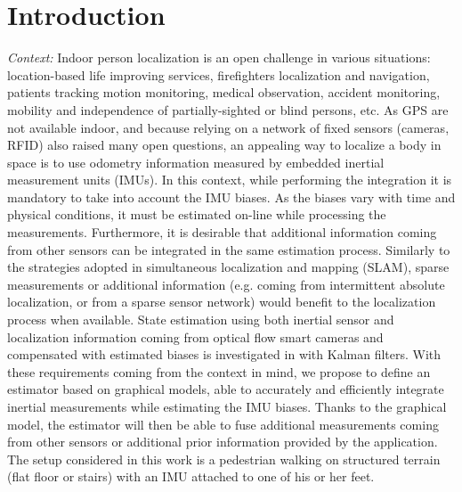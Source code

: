 
\section{Introduction}\label{sec:intro}

\textit{Context: }
Indoor person localization is an open challenge in various situations: location-based life improving services,
firefighters localization and navigation, patients tracking 
motion monitoring, medical observation, accident monitoring, mobility and independence of partially-sighted or blind persons, etc.
As GPS are not available indoor, and because relying on a network of fixed sensors (cameras, RFID) also raised many open questions, an appealing way to localize a body in space is to use odometry information measured by embedded inertial measurement units (IMUs).
In this context, while performing the integration it is mandatory to take into account the IMU biases.
As the biases vary with time and physical conditions, it must be estimated on-line while processing the measurements.
Furthermore, it is desirable that additional information coming from other sensors can be integrated in the same estimation process.
Similarly to the strategies adopted in simultaneous localization and mapping (SLAM), sparse measurements or additional information (e.g. coming from intermittent absolute localization, or from a sparse sensor network) would benefit to the localization process when available.
State estimation using both inertial sensor and localization information coming from optical flow smart cameras and compensated with estimated biases is investigated in \cite{santamaria2015high} with Kalman filters.
With these requirements coming from the context in mind, we propose to define an estimator based on graphical models, able to accurately and efficiently integrate inertial measurements while estimating the IMU biases. Thanks to the graphical model, the estimator will then be able to fuse additional measurements coming from other sensors or additional prior information provided by the application.
The setup considered in this work  is a pedestrian walking on structured terrain (flat floor or stairs) with an IMU attached to one of his or her feet.


